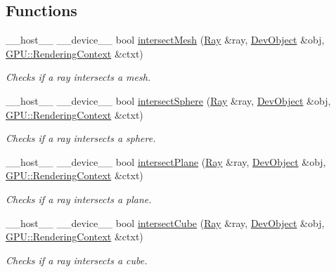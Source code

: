 \subsection*{Functions}
\begin{DoxyCompactItemize}
\item 
\+\_\+\+\_\+host\+\_\+\+\_\+ \+\_\+\+\_\+device\+\_\+\+\_\+ bool \hyperlink{group__intersection__test__prperties_gac9af7cfe676f4df793dea5bc53171161}{intersect\+Mesh} (\hyperlink{class_ray}{Ray} \&ray, \hyperlink{class_dev_object}{Dev\+Object} \&obj, \hyperlink{struct_g_p_u_1_1_rendering_context}{G\+P\+U\+::\+Rendering\+Context} \&ctxt)
\begin{DoxyCompactList}\small\item\em Checks if a ray intersects a mesh. \end{DoxyCompactList}\item 
\+\_\+\+\_\+host\+\_\+\+\_\+ \+\_\+\+\_\+device\+\_\+\+\_\+ bool \hyperlink{group__intersection__test__prperties_ga8c05ac13c3cdd49f7e4fa3948cfa4699}{intersect\+Sphere} (\hyperlink{class_ray}{Ray} \&ray, \hyperlink{class_dev_object}{Dev\+Object} \&obj, \hyperlink{struct_g_p_u_1_1_rendering_context}{G\+P\+U\+::\+Rendering\+Context} \&ctxt)
\begin{DoxyCompactList}\small\item\em Checks if a ray intersects a sphere. \end{DoxyCompactList}\item 
\+\_\+\+\_\+host\+\_\+\+\_\+ \+\_\+\+\_\+device\+\_\+\+\_\+ bool \hyperlink{group__intersection__test__prperties_gafbcfd99d540347f9f63d01d6d0b6eef5}{intersect\+Plane} (\hyperlink{class_ray}{Ray} \&ray, \hyperlink{class_dev_object}{Dev\+Object} \&obj, \hyperlink{struct_g_p_u_1_1_rendering_context}{G\+P\+U\+::\+Rendering\+Context} \&ctxt)
\begin{DoxyCompactList}\small\item\em Checks if a ray intersects a plane. \end{DoxyCompactList}\item 
\+\_\+\+\_\+host\+\_\+\+\_\+ \+\_\+\+\_\+device\+\_\+\+\_\+ bool \hyperlink{group__intersection__test__prperties_gae4778d3b0c160c9757d7fca0e5deefa2}{intersect\+Cube} (\hyperlink{class_ray}{Ray} \&ray, \hyperlink{class_dev_object}{Dev\+Object} \&obj, \hyperlink{struct_g_p_u_1_1_rendering_context}{G\+P\+U\+::\+Rendering\+Context} \&ctxt)
\begin{DoxyCompactList}\small\item\em Checks if a ray intersects a cube. \end{DoxyCompactList}\item 

\end{DoxyCompactItemize}
